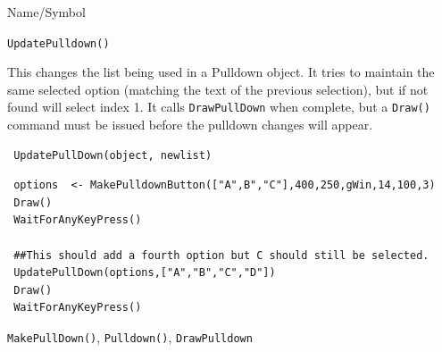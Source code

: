 \vfill
\newpage
{}
\vfill


\begin{desc}{Name/Symbol}
\item[Name/Symbol]  	\verb+UpdatePulldown()+

\item[Description]	
This changes the list being used in a Pulldown object.  It tries to maintain the same selected option (matching the text of the previous selection), but if not found will select index 1. It calls \verb+DrawPullDown+ when complete, but a \verb+Draw()+ command must be issued before the pulldown changes will appear.

\item[Usage]
\begin{verbatim}
 UpdatePullDown(object, newlist)
 \end{verbatim}

\item[Example]      	
\begin{verbatim}
 options  <- MakePulldownButton(["A",B","C"],400,250,gWin,14,100,3)
 Draw()
 WaitForAnyKeyPress()
 
 ##This should add a fourth option but C should still be selected.
 UpdatePullDown(options,["A","B","C","D"])
 Draw()
 WaitForAnyKeyPress()

\end{verbatim}

\item[See Also]	\verb+MakePullDown()+, \verb+Pulldown()+, \verb+DrawPulldown+
\end{desc}




